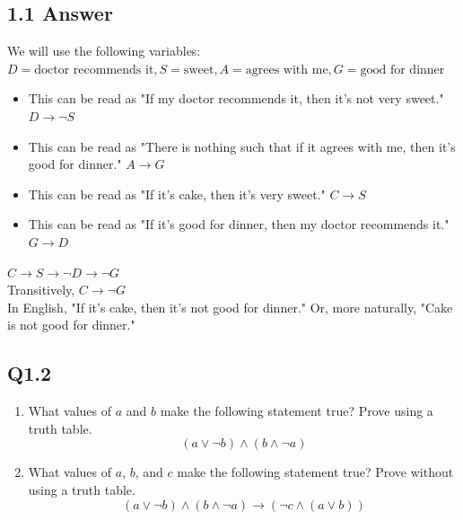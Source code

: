 \documentclass{article}
\begin{document}
\subsection*{1.1 Answer}
We will use the following variables: $D=\text{doctor recommends it},S=\text{sweet},A=\text{agrees with me},G=\text{good for dinner}$
\begin{itemize}
    \item This can be read as "If my doctor recommends it, then it's not very sweet." $D\rightarrow \neg S$
    \item This can be read as "There is nothing such that if it agrees with me, then it's good for dinner." $A\rightarrow G$
    \item This can be read as "If it's cake, then it's very sweet." $C\rightarrow S$
    \item This can be read as "If it's good for dinner, then my doctor recommends it." $G\rightarrow D$
\end{itemize}
$C\rightarrow S\rightarrow \neg D\rightarrow\neg G$
\\ Transitively, $C\rightarrow\neg G$
\\ In English, "If it's cake, then it's not good for dinner." Or, more naturally, "Cake is not good for dinner."
\newpage
\subsection*{Q1.2}
\begin{enumerate}[label=\alph*.]
    \item What values of $a$ and $b$ make the following statement true? Prove using a truth table.
    $$(a \lor \neg b) \land (b \land \neg a)$$
    \item What values of $a$, $b$, and $c$ make the following statement true? Prove without using a truth table.
    $$(a \lor \neg b) \land (b \land \neg a)\rightarrow (\neg c\land(a \lor b))$$
\end{enumerate}
\newpage
\end{document}
